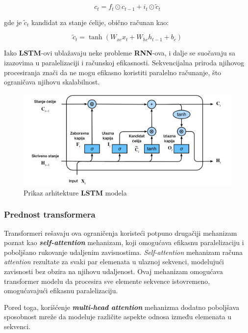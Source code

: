 \documentclass[12pt]{article}
\begin{document}
   \[ c_t = f_t \odot c_{t-1} + i_t \odot \tilde{c}_t \]

   gde je \( \tilde{c}_t \) kandidat za stanje ćelije, obično računan kao:

   \[ \tilde{c}_t = \tanh(W_{xc} x_t + W_{hc} h_{t-1} + b_c) \]

   Iako \textbf{LSTM}-ovi ublažavaju neke probleme \textbf{RNN}-ova, i dalje se suočavaju sa 
   izazovima u paralelizaciji i računskoj efikasnosti. Sekvencijalna priroda njihovog 
   procesiranja znači da ne mogu efikasno koristiti paralelno računanje, što ograničava njihovu 
   skalabilnost.

   \begin{figure}[h!]
      \centering
      \vspace{1.5cm} %
      \includegraphics[width=1\textwidth]{lstm.png}
      \caption{Prikaz arhitekture \textbf{LSTM} modela}
      \label{fig:lstm}
   \end{figure}

   \subsubsection{Prednost transformera}
   Transformeri rešavaju ova ograničenja koristeći potpuno drugačiji mehanizam poznat kao 
   \textbf{\textit{self-attention}} mehanizam, koji omogućava efikasnu paralelizaciju i poboljšano 
   rukovanje udaljenim zavisnostima. \textit{Self-attention} mehanizam računa \textit{attention} 
   rezultate za svaki par elemenata u ulaznoj sekvenci, modelujući zavisnosti bez obzira na njihovu
   udaljenost. Ovaj mehanizam omogućava transformer modelu da procesira sve elemente sekvence
   istovremeno, omogućavajući efikasnu paralelizaciju. 
   
   Pored toga, korišćenje \textbf{\textit{multi-head attention}} mehanizma dodatno poboljšava 
   sposobnost mreže da modeluje različite aspekte odnosa između elemenata u sekvenci.
\end{document}
